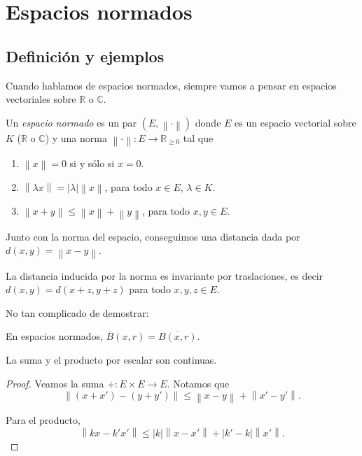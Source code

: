 \chapter{Espacios normados}

\section{Definición y ejemplos}

Cuando hablamos de espacios normados, siempre vamos a pensar en espacios vectoriales sobre $\mathbb{R}$ o $\mathbb{C}$.

\begin{definition}
	Un \emph{espacio normado} es un par $(E, \left\lVert \cdot \right\rVert)$ donde $E$ es un espacio vectorial sobre $K$ ($\mathbb{R}$ o $\mathbb{C}$) y una norma $\left\lVert \cdot \right\rVert : E \to \mathbb{R}_{\ge 0}$ tal que
	\begin{enumerate}
		\item $\left\lVert x \right\rVert = 0$ si y sólo si $x = 0$.
		\item $\left\lVert \lambda x \right\rVert = \left\lvert \lambda \right\rvert \left\lVert x \right\rVert$, para todo $x \in E$, $\lambda \in K$.
		\item $\left\lVert x + y \right\rVert \leq \left\lVert x \right\rVert + \left\lVert y \right\rVert$, para todo $x, y \in E$.
	\end{enumerate}
\end{definition}

Junto con la norma del espacio, conseguimos una distancia dada por $d(x, y) = \left\lVert x - y \right\rVert$.

\begin{remark}
	La distancia inducida por la norma es invariante por traslaciones, es decir $d(x, y) = d(x + z, y + z)$ para todo $x, y, z \in E$.
\end{remark}

No tan complicado de demostrar:

\begin{remark}
	En espacios normados, $\overline{B}(x, r) = \overline{B(x, r)}$.
\end{remark}

\begin{proposition}
	La suma y el producto por escalar son continuas.
\end{proposition}

\begin{proof}
	Veamos la suma $+ : E \times E \to E$. Notamos que
	\begin{equation*}
		\left\lVert (x + x') - (y + y')\right\rVert \leq \left\lVert x - y \right\rVert + \left\lVert x' - y' \right\rVert.
	\end{equation*}

	Para el producto,
	\begin{equation*}
		\left\lVert kx - k' x' \right\rVert \leq \left\lvert k \right\rvert \left\lVert x - x' \right\rVert + \left\lvert k' - k \right\rvert \left\lVert x' \right\rVert.
	\end{equation*}
\end{proof}

